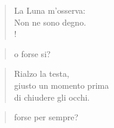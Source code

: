 
\begin{verse}
    La Luna m'osserva:\\
    Non ne sono degno.\\!
\end{verse}
\vspace{-0.9cm}
\begin{verse} \hfill o forse si? \end{verse}
\vspace{-0.9cm}
\begin{verse}
    Rialzo la testa,\\
    giusto un momento prima\\
    di chiudere gli occhi.\\
\end{verse}
\vspace{-0.9cm}
\begin{verse} \hfill forse per sempre? \end{verse}